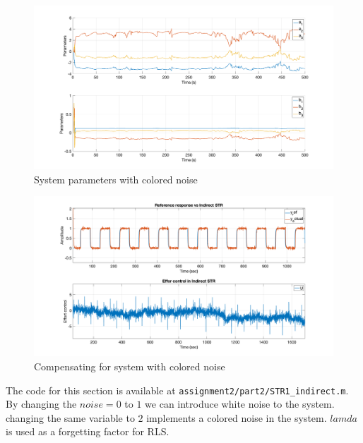 \begin{figure}
	\centering
	\includegraphics[width=\textwidth]{images/str75.png}
	\caption{System parameters with colored noise }
	\label{fig:str75}
\end{figure}

\begin{figure}
	\centering
	\includegraphics[width=\textwidth]{images/str76.png}
	\caption{Compensating for system with colored noise }
	\label{fig:str76}
\end{figure}
The code  for this section is available at \lstinline|assignment2/part2/STR1_indirect.m|. By changing the $noise=0$ to $1$ we can introduce white noise to the system. changing the same variable to $2$ implements a colored noise in the system. $lamda$ is used as a forgetting factor for RLS.
